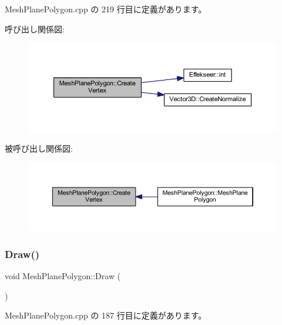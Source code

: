 Mesh\+Plane\+Polygon.\+cpp の 219 行目に定義があります。

呼び出し関係図\+:\nopagebreak
\begin{figure}[H]
\begin{center}
\leavevmode
\includegraphics[width=350pt]{class_mesh_plane_polygon_a50cdb56a3faa5d0bbb8ff75c3dcc2830_cgraph}
\end{center}
\end{figure}
被呼び出し関係図\+:\nopagebreak
\begin{figure}[H]
\begin{center}
\leavevmode
\includegraphics[width=350pt]{class_mesh_plane_polygon_a50cdb56a3faa5d0bbb8ff75c3dcc2830_icgraph}
\end{center}
\end{figure}
\mbox{\label{class_mesh_plane_polygon_a813d5d6897ec0ce2b672cd6e1360e281}} 
\subsubsection{\texorpdfstring{Draw()}{Draw()}}
{\footnotesize\ttfamily void Mesh\+Plane\+Polygon\+::\+Draw (\begin{DoxyParamCaption}{ }\end{DoxyParamCaption})}



 Mesh\+Plane\+Polygon.\+cpp の 187 行目に定義があります。

